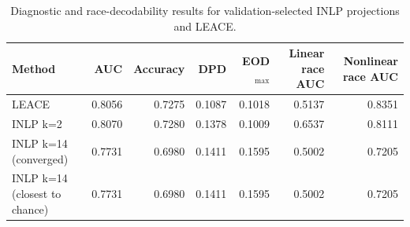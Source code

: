 \begin{table}[htbp]
\centering
\small
\caption{Diagnostic and race-decodability results for validation-selected INLP projections and LEACE.}
\label{tab:inlp-converged}
\begin{tabular}{lrrrrrr}
\toprule
Method & AUC & Accuracy & DPD & EOD$_{\max}$ & Linear race AUC & Nonlinear race AUC \\
\midrule
LEACE & 0.8056 & 0.7275 & 0.1087 & 0.1018 & 0.5137 & 0.8351 \\
INLP k=2 & 0.8070 & 0.7280 & 0.1378 & 0.1009 & 0.6537 & 0.8111 \\
INLP k=14 (converged) & 0.7731 & 0.6980 & 0.1411 & 0.1595 & 0.5002 & 0.7205 \\
INLP k=14 (closest to chance) & 0.7731 & 0.6980 & 0.1411 & 0.1595 & 0.5002 & 0.7205 \\
\bottomrule
\end{tabular}
\end{table}
